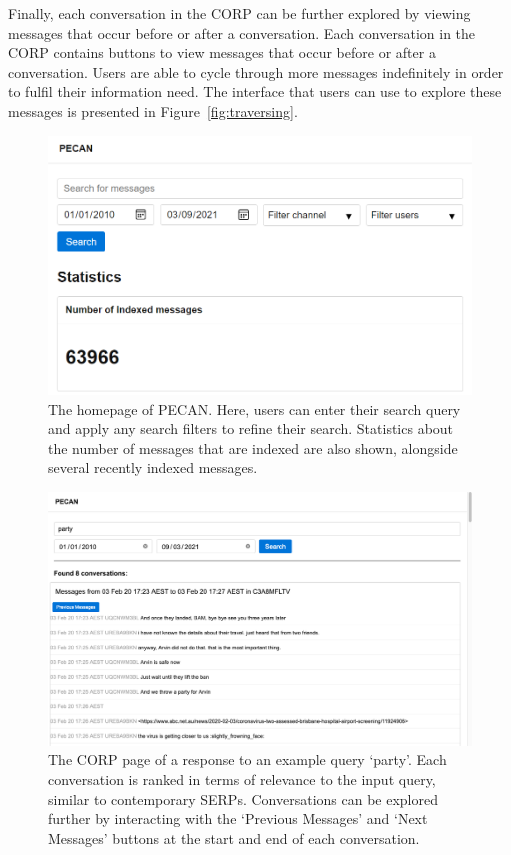 Finally, each conversation in the CORP can be further explored by viewing messages that occur before or after a conversation. Each conversation in the CORP contains buttons to view messages that occur before or after a conversation. Users are able to cycle through more messages indefinitely in order to fulfil their information need. The interface that users can use to explore these messages is presented in Figure~\ref{fig:traversing}.

\begin{figure}
	\includegraphics[width=\linewidth]{homepage}
	\caption{The homepage of PECAN. Here, users can enter their search query and apply any search filters to refine their search. Statistics about the number of messages that are indexed are also shown, alongside several recently indexed messages.}
	\label{fig:homepage}
\end{figure}

\begin{figure}
	\includegraphics[width=\linewidth]{searching}
	\caption{The CORP page of a response to an example query `party'. Each conversation is ranked in terms of relevance to the input query, similar to contemporary SERPs. Conversations can be explored further by interacting with the `Previous Messages' and `Next Messages' buttons at the start and end of each conversation.}
	\label{fig:searching}
\end{figure}

